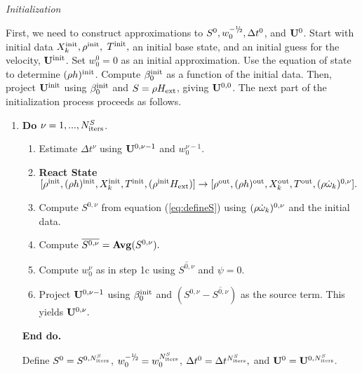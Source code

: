  {\em Initialization}

First, we need to construct approximations to $S^0, w_0^{-\myhalf}, \Delta t^0$, 
and ${\bf U}^0$.  Start with initial data $X_k^{\mathrm{init}}, \rho^{\mathrm{init}},$ $T^{\mathrm{init}},$ an 
initial base state, and an initial guess for the velocity, ${\bf U}^{\mathrm{init}}$.
Set $w_0^0 = 0$ as an initial approximation.  Use the equation of state to 
determine $(\rho h)^{\mathrm{init}}$.  Compute $\beta_0^{\mathrm{init}}$ as a function of 
the initial data.  Then, project ${\bf U}^{\mathrm{init}}$ using $\beta_0^{\mathrm{init}}$ and 
$S = \rho{H_{\rm ext}}$, giving ${\bf U}^{0,0}$.  The next part of the initialization process 
proceeds as follows.

\begin{enumerate}
\renewcommand{\theenumi}{{\bf \alph{enumi}}}
\renewcommand{\labelenumii}{\roman{enumii}.}

\item {\bf Do} {$\nu = 1,...,N_{\rm iters}^{S}$.}
  \begin{enumerate}

  \item Estimate $\Delta t^\nu$ using ${\bf U}^{0,\nu-1}$ and $w_0^{\nu-1}.$

  \item {\bf React State}$[ \rho^{\mathrm{init}},(\rho h)^{\mathrm{init}}, X_k^{\mathrm{init}}, T^{\mathrm{init}}, (\rho^{\mathrm{init}} {H_{\rm ext}}) ] \rightarrow [\rho^{\mathrm{out}}, (\rho h)^{\mathrm{out}}, X_k^{\mathrm{out}}, T^{\mathrm{out}}, (\rho \dot{\omega}_k)^{0,\nu} ].$

  \item Compute $S^{0,\nu}$ from equation (\ref{eq:defineS}) 
        using $(\rho \dot{\omega}_k)^{0,\nu}$ and the initial data.

  \item Compute $\overline{S^{0,\nu}} = {\mathrm{\bf Avg}} (S^{0,\nu}).$

  \item Compute $w_0^{\nu}$ as in step 1c using $\overline{S^{0,\nu}}$ and $\psi=0$.
        
  \item Project ${\bf U}^{0,\nu-1}$ using $\beta_0^{\mathrm{init}}$ and 
        $(S^{0,\nu} - \overline{S^{0,\nu}})$ as the source term.  
        This yields ${\bf U}^{0,\nu}.$

  \end{enumerate}

  {\bf End do.}

  Define $S^0 = S^{0,N_{\rm iters}^S}$, $w_0^{-\myhalf} = w_0^{N_{\rm iters}^S}$, 
$\Delta t^0 = \Delta t^{N_{\rm iters}^S},$ and ${\bf U}^0 = {\bf U}^{0,N_{\rm iters}^S}.$

\end{enumerate}

